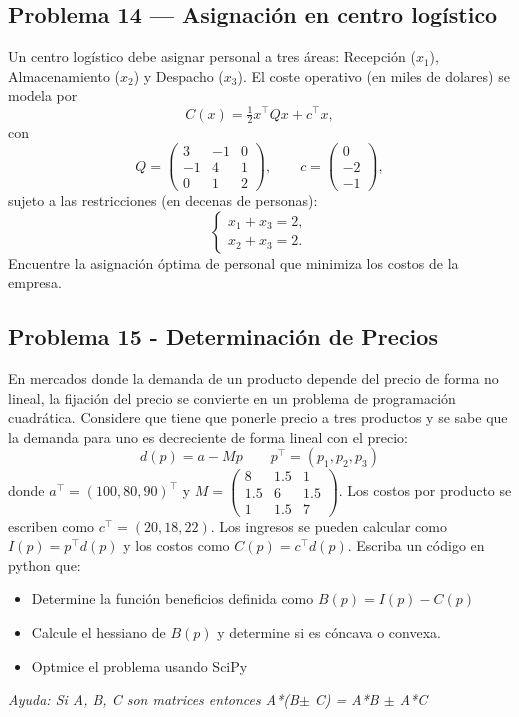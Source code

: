 \documentclass[12pt]{article}
\begin{document}
\subsection*{Problema 14 — Asignación en centro logístico }
Un centro logístico debe asignar personal a tres áreas: Recepción (\(x_1\)), Almacenamiento (\(x_2\)) y Despacho (\(x_3\)). El coste operativo (en miles de dolares) se modela por
\[
C(x)=\tfrac12 x^\top Q x + c^\top x,
\]
con
\[
Q=\begin{pmatrix}3&-1&0\\[4pt]-1&4&1\\[4pt]0&1&2\end{pmatrix},\qquad
c=\begin{pmatrix}0\\[4pt]-2\\[4pt]-1\end{pmatrix},
\]
sujeto a las restricciones (en decenas de personas):
\[
\begin{cases}
x_1+x_3=2,\\[4pt]
x_2+x_3=2.
\end{cases}
\]
Encuentre la asignación óptima de personal que minimiza los costos de la empresa.

\subsection*{Problema 15 - Determinación de Precios}
En mercados donde la demanda de un producto depende del precio de forma no lineal, la fijación del precio se convierte en un problema de programación cuadrática. Considere que tiene que ponerle precio a tres productos y se sabe que la demanda para uno es decreciente de forma lineal con el precio:
\begin{equation*}
    d(p) = a - Mp \qquad p^{\top} = (p_1,p_2,p_3)
\end{equation*}
donde $a^\top = (100,80,90)^{\top}$ y $M = \begin{pmatrix}
    8 & 1.5 & 1 \\
    1.5 & 6 & 1.5 \\
    1 & 1.5 & 7 
\end{pmatrix}$. Los costos por producto se escriben como $c^{\top} = (20,18,22)$. Los ingresos se pueden calcular como $I(p) = p^{\top}d(p)$ y los costos como $C(p) = c^{\top} d(p)$. Escriba un código en python que:
\begin{itemize}
    \item[a)] Determine la función beneficios definida como $B(p) = I(p) - C(p)$ 
    \item[b)] Calcule el hessiano de $B(p)$ y determine si es cóncava o convexa. 
    \item[c)] Optmice el problema usando SciPy 
\end{itemize}
\textit{Ayuda: Si A, B, C son matrices entonces A*(B$\pm$ C) = A*B $\pm$ A*C}
\end{document}
